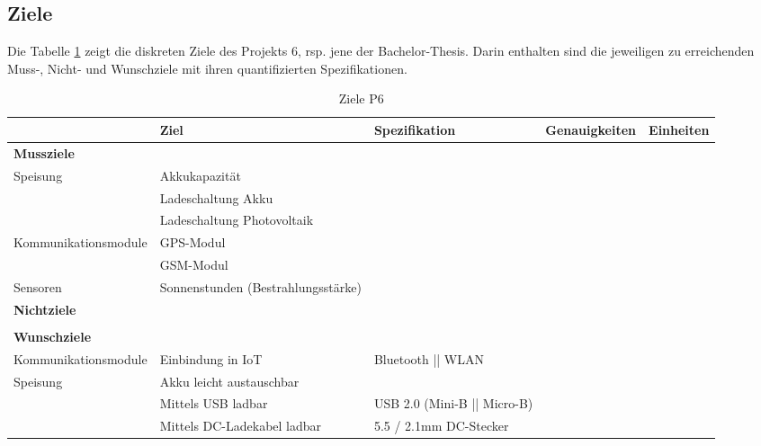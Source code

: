 \begin{landscape}
\subsection{Ziele}
Die Tabelle \ref{tab:ZieleP6} zeigt die diskreten Ziele des Projekts 6, rsp. jene der Bachelor-Thesis. Darin enthalten sind die jeweiligen zu erreichenden Muss-, Nicht- und Wunschziele mit ihren quantifizierten Spezifikationen.\\

\begin{table}[htbp]
  \centering
  \renewcommand{\arraystretch}{1.4}
  \caption{Ziele P6}
    \begin{tabular}{l|l|l|r|r}
          & \textbf{Ziel} & \multicolumn{1}{l|}{\textbf{Spezifikation}} & \multicolumn{1}{l|}{\textbf{Genauigkeiten}} & \multicolumn{1}{l}{\textbf{Einheiten}} \\
    \toprule
    \multicolumn{1}{l}{\textbf{Mussziele}} & \multicolumn{1}{r}{} & \multicolumn{1}{r}{} & \multicolumn{1}{r}{} &  \\
    \toprule
    \multirow{3}{*}{Speisung} & Akkukapazität &       &       &  \\
\cline{2-5}          & Ladeschaltung Akku &       &       &  \\
\cline{2-5}           & Ladeschaltung Photovoltaik &       &       &  \\
    \hline
    \multirow{2}{*}{Kommunikationsmodule} & GPS-Modul   &       &       &  \\
\cline{2-5}          & GSM-Modul  &       &       &  \\
\hline
Sensoren & Sonnenstunden (Bestrahlungsstärke) &       &       &  \\
    \bottomrule
    \multicolumn{1}{l}{\textbf{Nichtziele}} & \multicolumn{1}{r}{} & \multicolumn{1}{r}{} & \multicolumn{1}{r}{} &  \\
    \toprule
    & & & & \\
    \bottomrule
    \multicolumn{1}{l}{\textbf{Wunschziele}} & \multicolumn{1}{r}{} & \multicolumn{1}{r}{} & \multicolumn{1}{r}{} &  \\
    \toprule
    Kommunikationsmodule & Einbindung in IoT &       Bluetooth || WLAN &       &  \\
    \hline
    \multirow{3}{*}{Speisung} & Akku leicht austauschbar &       &       &  \\
\cline{2-5}  & Mittels USB ladbar & USB 2.0 (Mini-B || Micro-B) &       &  \\
\cline{2-5}  & Mittels DC-Ladekabel ladbar &      5.5 / 2.1mm DC-Stecker &       &  \\
    \bottomrule
    \end{tabular}%
  \label{tab:ZieleP6}%
\end{table}%
\end{landscape}
